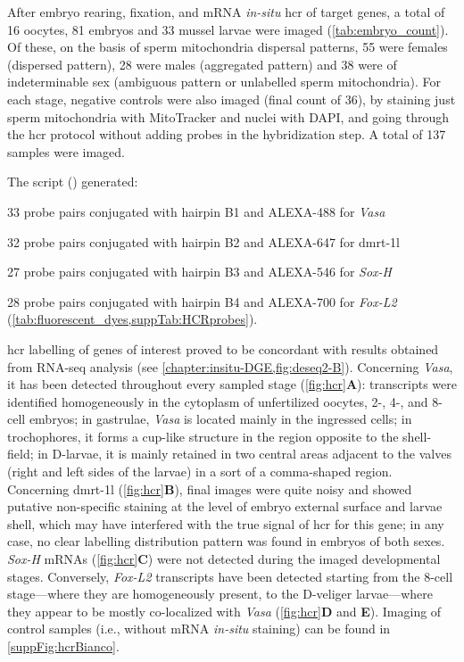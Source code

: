 After embryo rearing, fixation, and mRNA \textit{in-situ} \gls{hcr} of target genes, a total of 16 oocytes, 81 embryos and 33 mussel larvae were imaged (\cref{tab:embryo_count}). Of these, on the basis of sperm mitochondria dispersal patterns, 55 were females (dispersed pattern), 28 were males (aggregated pattern) and 38 were of indeterminable sex (ambiguous pattern or unlabelled sperm mitochondria). For each stage, negative controls were also imaged (final count of 36), by staining just sperm mitochondria with MitoTracker and nuclei with DAPI, and going through the \gls{hcr} protocol without adding probes in the hybridization step. A total of 137 samples were imaged.

The  script () generated:
\begin{inlinelist}[itemjoin={{; }}, itemjoin*={{; and }}]
	\item 33 probe pairs conjugated with hairpin B1 and ALEXA-488 for \textit{Vasa}
	\item 32 probe pairs conjugated with hairpin B2 and ALEXA-647 for \gls{dmrt-1l}
	\item 27 probe pairs conjugated with hairpin B3 and ALEXA-546 for \textit{Sox-H}
	\item 28 probe pairs conjugated with hairpin B4 and ALEXA-700 for \textit{Fox-L2} (\cref{tab:fluorescent_dyes,suppTab:HCRprobes}).
\end{inlinelist}
\gls{hcr} labelling of genes of interest proved to be concordant with results obtained from RNA-seq analysis (see \cref{chapter:insitu-DGE,fig:deseq2-B}). Concerning \textit{Vasa}, it has been detected throughout every sampled stage (\cref{fig:hcr}\textbf{A}): transcripts were identified homogeneously in the cytoplasm of unfertilized oocytes, 2-, 4-, and 8-cell embryos; in gastrulae, \textit{Vasa} is located mainly in the ingressed cells; in trochophores, it forms a cup-like structure in the region opposite to the shell-field; in D-larvae, it is mainly retained in two central areas adjacent to the valves (right and left sides of the larvae) in a sort of a comma-shaped region. Concerning \gls{dmrt-1l} (\cref{fig:hcr}\textbf{B}), final images were quite noisy and showed putative non-specific staining at the level of embryo external surface and larvae shell, which may have interfered with the true signal of \gls{hcr} for this gene; in any case, no clear labelling distribution pattern was found in embryos of both sexes. \textit{Sox-H} mRNAs (\cref{fig:hcr}\textbf{C}) were not detected during the imaged developmental stages. Conversely, \textit{Fox-L2} transcripts have been detected starting from the 8-cell stage—where they are homogeneously present, to the D-veliger larvae—where they appear to be mostly co-localized with \textit{Vasa} (\cref{fig:hcr}\textbf{D} and \textbf{E}). Imaging of control samples (i.e., without mRNA \textit{in-situ} staining) can be found in \cref{suppFig:hcrBianco}.

